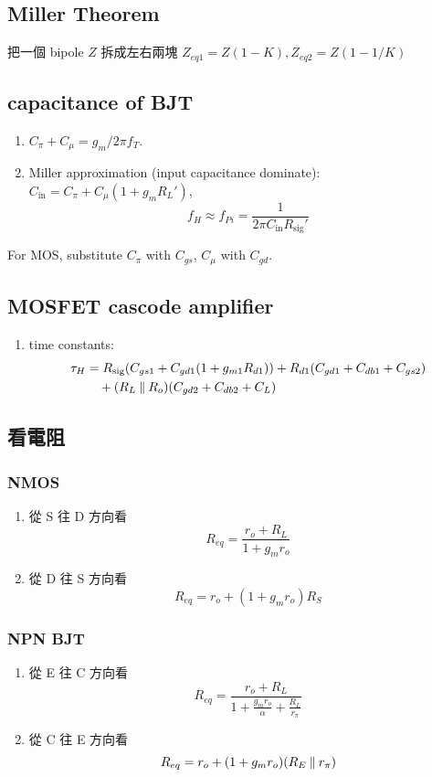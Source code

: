 \documentclass[12pt, a4paper]{article}
\begin{document}
\subsection{Miller Theorem}
把一個 bipole $Z$ 拆成左右兩塊
$Z_{eq1} = Z (1-K), Z_{eq2} = Z (1 - 1/K)$
\subsection{capacitance of BJT}
\begin{enumerate}
  \item $C_\pi + C_\mu = g_m / 2\pi f_T$.
  \item Miller approximation (input capacitance dominate):
    $C_\text{in} = C_\pi + C_\mu(1 + g_mR_L')$,
    \[ f_H \approx f_{Pi} = \frac{1}{2\pi C_\text{in} R_\text{sig}'} \]
\end{enumerate}
For MOS, substitute $C_\pi$ with $C_{gs}$, $C_\mu$ with $C_{gd}$.
\subsection{MOSFET cascode amplifier}
\begin{enumerate}
  \item time constants:
    \begin{align*}
      \tau_{H} &= R_\text{sig} (C_{gs1} + C_{gd1}(1+g_{m1}R_{d1}))
      + R_{d1}(C_{gd1} + C_{db1} + C_{gs2}) \\
      & \quad + (R_L \mathbin{\|} R_o) (C_{gd2} + C_{db2} + C_L)
    \end{align*}
\end{enumerate}
\subsection{看電阻}
\subsubsection{NMOS}
\begin{enumerate}
  \item 從 S 往 D 方向看 
    \[ R_{eq} = \frac{r_o + R_L}{1+g_mr_o} \]
  \item 從 D 往 S 方向看 
    \[ R_{eq} = r_o + (1 + g_m r_o) R_S \]
\end{enumerate}
\subsubsection{NPN BJT}
\begin{enumerate}
  \item 從 E 往 C 方向看 
    \[ R_{eq} = \frac{r_o + R_L}{1+\frac{g_mr_o}{\alpha} + \frac{R_L}{r_\pi}} \]
  \item 從 C 往 E 方向看 
    \[ R_{eq} = r_o + (1 + g_mr_o) (R_E \mathbin{\|} r_\pi) \]
\end{enumerate}
\end{document}
